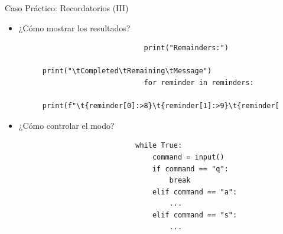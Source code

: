 \documentclass{beamer}
\begin{document}
    \begin{frame}[fragile]{Caso Práctico: Recordatorios (III)}
        \begin{itemize}
          \item ¿Cómo mostrar los resultados?
          \begin{figure}
              \begin{minipage}[c]{0.7\textwidth}
                  \begin{verbatim}
                        print("Remainders:")
                        print("\tCompleted\tRemaining\tMessage")
                        for reminder in reminders:
                            print(f"\t{reminder[0]:>8}\t{reminder[1]:>9}\t{reminder[2]}")
                  \end{verbatim}
              \end{minipage}
          \end{figure}
          \item ¿Cómo controlar el modo?
          \begin{figure}
              \begin{minipage}[c]{0.7\textwidth}
                  \begin{verbatim}
                      while True:
                          command = input()
                          if command == "q":
                              break
                          elif command == "a":
                              ...
                          elif command == "s":
                              ...
                  \end{verbatim}
              \end{minipage}
          \end{figure}
        \end{itemize}
    \end{frame}
\end{document}
